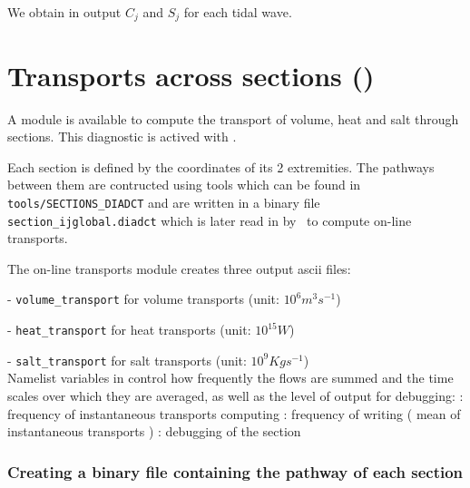 \documentclass[../main/NEMO_manual]{subfiles}
\begin{document}
We obtain in output $C_{j}$ and $S_{j}$ for each tidal wave.

\section[Transports across sections (\texttt{\textbf{key\_diadct}})]{Transports across sections (\protect{})}
\label{sec:DIA_diag_dct}

\begin{listing}
  \caption{}
  \label{lst:nam_diadct}
\end{listing}

A module is available to compute the transport of volume, heat and salt through sections.
This diagnostic is actived with .

Each section is defined by the coordinates of its 2 extremities.
The pathways between them are contructed using tools which can be found in \texttt{tools/SECTIONS\_DIADCT}
and are written in a binary file \texttt{section\_ijglobal.diadct} which is later read in by
\NEMO\ to compute on-line transports.

The on-line transports module creates three output ascii files:

- \texttt{volume\_transport} for volume transports (unit: $10^{6} m^{3} s^{-1}$)

- \texttt{heat\_transport}   for   heat transports (unit: $10^{15} W$)

- \texttt{salt\_transport}   for   salt transports (unit: $10^{9}Kg s^{-1}$) \\

Namelist variables in  control how frequently the flows are summed and the time scales over which
they are averaged, as well as the level of output for debugging:
   : frequency of instantaneous transports computing
: frequency of writing ( mean of instantaneous transports )
 : debugging of the section

\subsubsection{Creating a binary file containing the pathway of each section}
\end{document}
